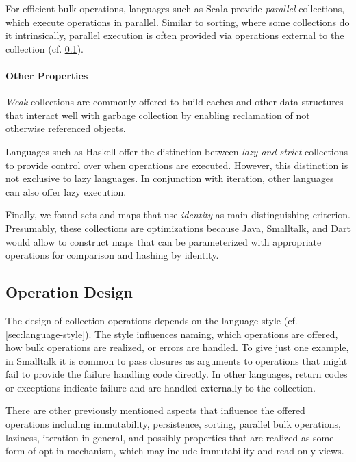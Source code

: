 \documentclass[sigconf, 10pt]{acmart}
\begin{document}
For efficient bulk operations,
languages such as Scala provide \emph{parallel} collections,
which execute operations in parallel.
Similar to sorting, where some collections do it intrinsically,
parallel execution is often provided via operations
external to the collection (cf. \cref{sec:operations}).

\paragraph{Other Properties}

\emph{Weak} collections are commonly offered to build caches
and other data structures that interact well with garbage collection
by enabling reclamation of not otherwise referenced objects.

Languages such as Haskell offer the distinction between \emph{lazy and strict}
collections to provide control over when operations are executed.
However, this distinction is not exclusive to lazy languages.
In conjunction with iteration,
other languages can also offer lazy execution.


Finally, we found sets and maps
that use \emph{identity} as main distinguishing criterion.
Presumably, these collections are optimizations
because Java, Smalltalk, and Dart would allow to construct
maps that can be parameterized with appropriate operations
for comparison and hashing by identity.

\subsection{Operation Design}
\label{sec:operations}

The design of collection operations depends
on the language style (cf. \cref{sec:language-style}).
The style influences naming, which operations are offered,
how bulk operations are realized, or errors are handled.
To give just one example, in Smalltalk it is common to pass closures as arguments
to operations that might fail to provide the failure handling code directly.
In other languages, return codes or exceptions indicate failure
and are handled externally to the collection.

There are other previously mentioned aspects
that influence the offered operations including immutability, persistence,
sorting, parallel bulk operations, laziness, iteration in general,
and possibly properties that are realized as some form of opt-in mechanism,
which may include immutability and read-only views.
\end{document}

